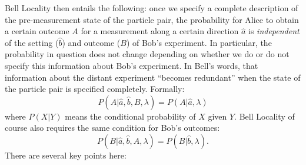 \documentclass[aps,prc,onecolumn,12pt]{revtex4-2}
\begin{document}
Bell Locality then entails the following:  once we specify a
complete description of the pre-measurement state of the particle
pair, the probability for Alice to obtain a certain outcome $A$ for a
measurement along a certain direction $\hat{a}$ is \emph{independent}
of the setting ($\hat{b}$) and outcome ($B$) of Bob's experiment.  In
particular, the probability in question does not change depending on
whether we do or do not specify this information about Bob's
experiment.  In Bell's words, that information about the
distant experiment ``becomes redundant'' when the state of the
particle pair is specified completely.
Formally:
\begin{equation}
P(A|\hat{a},\hat{b},B,\lambda) = P(A|\hat{a}, \lambda)
\label{bellloc}
\end{equation}
where $P(X|Y)$ means the conditional probability of $X$ given $Y$.
Bell Locality of course also requires the same condition for Bob's
outcomes:
\begin{equation}
P(B|\hat{a},\hat{b},A,\lambda) = P(B|\hat{b},\lambda).
\label{belllocb}
\end{equation}
There are several key points here:
\end{document}
